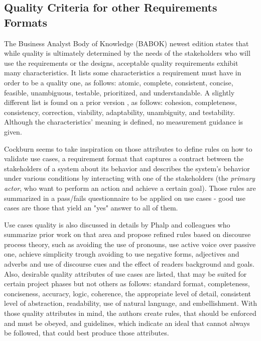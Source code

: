 \subsection{Quality Criteria for other Requirements Formats}

The Business Analyst Body of Knowledge (BABOK) newest edition \cite{Babok_2015} states that while quality is ultimately determined by the needs of the stakeholders who will use the requirements or the designs, acceptable quality requirements exhibit many characteristics. It lists some characteristics a requirement must have in order to be a quality one, as follows: atomic, complete, consistent, concise, feasible, unambiguous, testable, prioritized, and understandable. A slightly different list is found on a prior version \cite{Babok_2009}, as follows: cohesion, completeness, consistency, correction, viability, adaptability, unambiguity, and testability. Although the characteristics' meaning is defined, no measurement guidance is given.

Cockburn \cite{Cockburn_2000} seems to take inspiration on those attributes to define rules on how to validate use cases, a requirement format that captures a contract between the stakeholders of a system about its behavior and describes the system’s behavior under various conditions by interacting with one of the stakeholders (the \textit{primary actor}, who want to perform an action and achieve a certain goal). Those rules are summarized in a pass/fails questionnaire to be applied on use cases - good use cases are those that yield an "yes" answer to all of them.

Use cases quality is also discussed in details by Phalp and colleagues \cite{Phalp_et_dot_al_2011} who summarize prior work on that area and propose refined rules based on discourse process theory, such as avoiding the use of pronouns, use active voice over passive one, achieve simplicity trough avoiding to use negative forms, adjectives and adverbs and use of discourse cues and the effect of readers background and goals. Also, desirable quality attributes of use cases are listed, that may be suited for certain project phases but not others as follows: standard format, completeness, conciseness, accuracy, logic, coherence, the appropriate level of detail, consistent level of abstraction, readability, use of natural language, and embellishment. With those quality attributes in mind, the authors create rules, that should be enforced and must be obeyed, and guidelines, which indicate an ideal that cannot always be followed, that could best produce those attributes.

